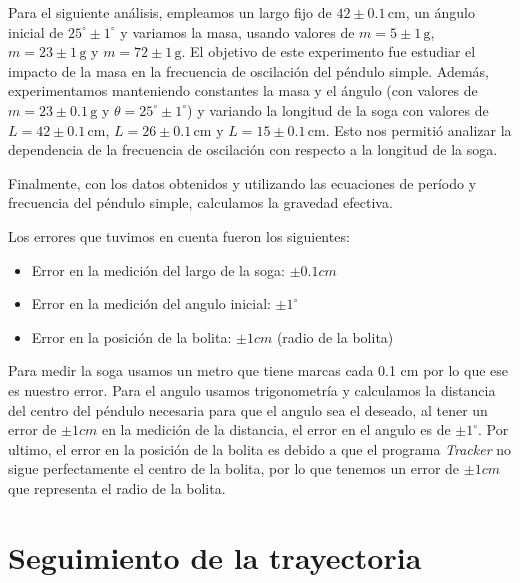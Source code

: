 \documentclass[12pt,a4]{article}
\begin{document}
Para el siguiente análisis, empleamos un largo fijo de $42 \pm 0.1 \, \text{cm}$, un ángulo inicial de $25^\circ \pm 1^\circ$ y variamos la masa, usando valores de $m = 5 \pm 1 \, \text{g}$, $m = 23 \pm 1 \, \text{g}$ y $m = 72 \pm 1 \, \text{g}$. El objetivo de este experimento fue estudiar el impacto de la masa en la frecuencia de oscilación del péndulo simple. Además, experimentamos manteniendo constantes la masa y el ángulo (con valores de $m = 23 \pm 0.1 \, \text{g}$ y $\theta = 25^\circ \pm 1^\circ$) y variando la longitud de la soga con valores de $L = 42 \pm 0.1 \, \text{cm}$, $L = 26 \pm 0.1 \, \text{cm}$ y $L = 15 \pm 0.1 \, \text{cm}$. Esto nos permitió analizar la dependencia de la frecuencia de oscilación con respecto a la longitud de la soga.

Finalmente, con los datos obtenidos y utilizando las ecuaciones de período y frecuencia del péndulo simple, calculamos la gravedad efectiva.


Los errores que tuvimos en cuenta fueron los siguientes:

\begin{itemize}
    \item Error en la medición del largo de la soga: $\pm 0.1 cm$
    \item Error en la medición del angulo inicial: $\pm 1^\circ$
    \item Error en la posición de la bolita: $\pm 1 cm$ (radio de la bolita)
\end{itemize}

Para medir la soga usamos un metro que tiene marcas cada 0.1 cm por lo que ese es nuestro error. Para el angulo usamos trigonometría y calculamos la distancia del centro del péndulo necesaria para que el angulo sea el deseado, al tener un error de $\pm 1 cm$ en la medición de la distancia, el error en el angulo es de $\pm 1^\circ$. Por ultimo, el error en la posición de la bolita es debido a que el programa \textit{Tracker} no sigue perfectamente el centro de la bolita, por lo que tenemos un error de $\pm 1 cm$ que representa el radio de la bolita.

\section{Seguimiento de la trayectoria}
\end{document}

